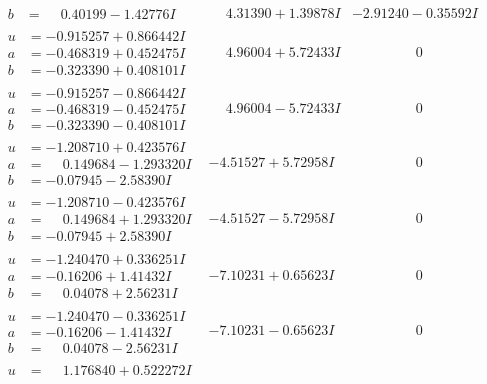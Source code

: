 \documentclass[1p]{elsarticle_modified}
\theoremstyle{definition}
\begin{document}
$$\begin{array}{c|c|c}
\begin{aligned}
b &= \phantom{-}0.40199 - 1.42776 I\end{aligned}
 & \phantom{-}4.31390 + 1.39878 I & -2.91240 - 0.35592 I \\ \hline\begin{aligned}
u &= -0.915257 + 0.866442 I \\
a &= -0.468319 + 0.452475 I \\
b &= -0.323390 + 0.408101 I\end{aligned}
 & \phantom{-}4.96004 + 5.72433 I & \phantom{-0.000000 } 0 \\ \hline\begin{aligned}
u &= -0.915257 - 0.866442 I \\
a &= -0.468319 - 0.452475 I \\
b &= -0.323390 - 0.408101 I\end{aligned}
 & \phantom{-}4.96004 - 5.72433 I & \phantom{-0.000000 } 0 \\ \hline\begin{aligned}
u &= -1.208710 + 0.423576 I \\
a &= \phantom{-}0.149684 - 1.293320 I \\
b &= -0.07945 - 2.58390 I\end{aligned}
 & -4.51527 + 5.72958 I & \phantom{-0.000000 } 0 \\ \hline\begin{aligned}
u &= -1.208710 - 0.423576 I \\
a &= \phantom{-}0.149684 + 1.293320 I \\
b &= -0.07945 + 2.58390 I\end{aligned}
 & -4.51527 - 5.72958 I & \phantom{-0.000000 } 0 \\ \hline\begin{aligned}
u &= -1.240470 + 0.336251 I \\
a &= -0.16206 + 1.41432 I \\
b &= \phantom{-}0.04078 + 2.56231 I\end{aligned}
 & -7.10231 + 0.65623 I & \phantom{-0.000000 } 0 \\ \hline\begin{aligned}
u &= -1.240470 - 0.336251 I \\
a &= -0.16206 - 1.41432 I \\
b &= \phantom{-}0.04078 - 2.56231 I\end{aligned}
 & -7.10231 - 0.65623 I & \phantom{-0.000000 } 0 \\ \hline\begin{aligned}
u &= \phantom{-}1.176840 + 0.522272 I \\

\end{aligned}
\end{array}$$
\end{document}
